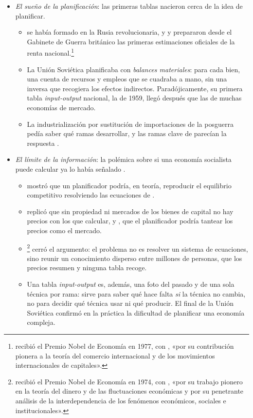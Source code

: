 \documentclass[11pt]{article}
\begin{document}
\begin{itemize}
\item \emph{El sueño de la planificación}: las primeras tablas nacieron cerca de la idea de planificar.
  \begin{itemize}
  \item {} se había formado en la Rusia revolucionaria, y  y  prepararon desde el Gabinete de Guerra británico las primeras estimaciones oficiales de la renta nacional.\footnote{ recibió el Premio Nobel de Economía en 1977, con , «por su contribución pionera a la teoría del comercio internacional y de los movimientos internacionales de capitales»\nocite{Nobel1977Meade}.}
  \item La Unión Soviética planificaba con \emph{balances materiales}: para cada bien, una cuenta de recursos y empleos que se cuadraba a mano, sin una inversa que recogiera los efectos indirectos. Paradójicamente, su primera tabla \emph{input-output} nacional, la de 1959, llegó después que las de muchas economías de mercado.
  \item La industrialización por sustitución de importaciones de la posguerra pedía saber qué ramas desarrollar, y las ramas clave de  parecían la respuesta .
  \end{itemize}
\item \emph{El límite de la información}: la polémica sobre si una economía socialista puede calcular ya lo había señalado .
  \begin{itemize}
  \item \textcite{Barone1908Ministro} mostró que un planificador podría, en teoría, reproducir el equilibrio competitivo resolviendo las ecuaciones de .
  \item \textcite{Mises1920Wirtschaftsrechnung} replicó que sin propiedad ni mercados de los bienes de capital no hay precios con los que calcular, y \textcite{Lange1936Socialism}, que el planificador podría tantear los precios como el mercado.
  \item \textcite{Hayek1945Use}\footnote{ recibió el Premio Nobel de Economía en 1974, con , «por su trabajo pionero en la teoría del dinero y de las fluctuaciones económicas y por su penetrante análisis de la interdependencia de los fenómenos económicos, sociales e institucionales»\nocite{Nobel1974}.} cerró el argumento: el problema no es resolver un sistema de ecuaciones, sino reunir un conocimiento disperso entre millones de personas, que los precios resumen y ninguna tabla recoge.
  \item Una tabla \emph{input-output} es, además, una foto del pasado y de una sola técnica por rama: sirve para saber qué hace falta \emph{si} la técnica no cambia, no para decidir qué técnica usar ni qué producir. El final de la Unión Soviética confirmó en la práctica la dificultad de planificar una economía compleja.
  \end{itemize}
\end{itemize}
\end{document}

